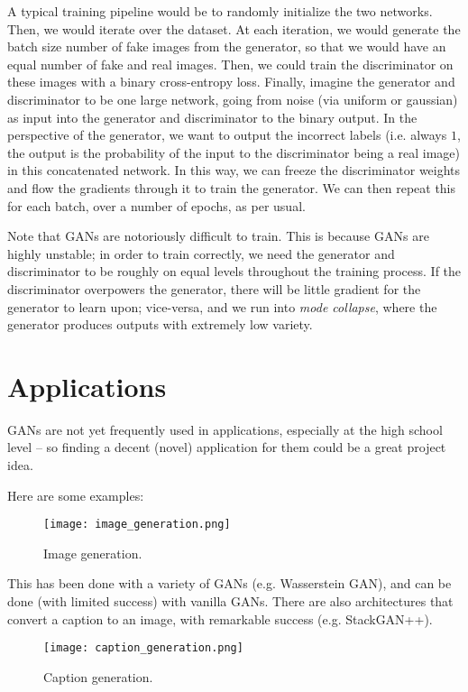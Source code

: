 \documentclass{article}
\begin{document}
    A typical training pipeline would be to randomly initialize the two networks. Then, we would iterate over the dataset. At each iteration, we would generate the batch size number of fake images from the generator, so that we would have an equal number of fake and real images. Then, we could train the discriminator on these images with a binary cross-entropy loss. Finally, imagine the generator and discriminator to be one large network, going from noise (via uniform or gaussian) as input into the generator and discriminator to the binary output. In the perspective of the generator, we want to output the incorrect labels (i.e. always $1$, the output is the probability of the input to the discriminator being a real image) in this concatenated network. In this way, we can freeze the discriminator weights and flow the gradients through it to train the generator. We can then repeat this for each batch, over a number of epochs, as per usual.
    
    Note that GANs are notoriously difficult to train. This is because GANs are highly unstable; in order to train correctly, we need the generator and discriminator to be roughly on equal levels throughout the training process. If the discriminator overpowers the generator, there will be little gradient for the generator to learn upon; vice-versa, and we run into \textit{mode collapse}, where the generator produces outputs with extremely low variety.
    

\section{Applications}
    GANs are not yet frequently used in applications, especially at the high school level -- so finding a decent (novel) application for them could be a great project idea.
    
    Here are some examples:

    \begin{figure}[H]
        \centerline{\texttt{[image: image\_generation.png]}}
        \caption{Image generation.}
        \label{fig:image_generation}
    \end{figure}
    
    This has been done with a variety of GANs (e.g. Wasserstein GAN), and can be done (with limited success) with vanilla GANs. There are also architectures that convert a caption to an image, with remarkable success (e.g. StackGAN++).
    
    
    \begin{figure}[H]
        \centerline{\texttt{[image: caption\_generation.png]}}
        \caption{Caption generation.}
        \label{fig:caption_generation}
    \end{figure}
    
\end{document}
